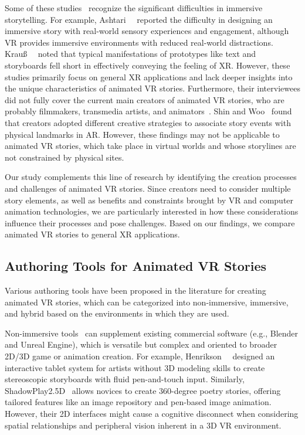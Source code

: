 Some of these studies~\cite{ashtari2020creating, krauss2021current, borsting2022software, krauss2022elements, mendez2025immersivesurvey} recognize the significant difficulties in immersive storytelling. 
For example, Ashtari~\etal~\cite{ashtari2020creating} reported the difficulty in designing an immersive story with real-world sensory experiences and engagement, although VR provides immersive environments with reduced real-world distractions. 
Krauß~\etal~\cite{krauss2022elements} noted that typical manifestations of prototypes like text and storyboards fell short in effectively conveying the feeling of XR. However, these studies primarily focus on general XR applications and lack deeper insights into the unique characteristics of animated VR stories. Furthermore, their interviewees did not fully cover the current main creators of animated VR stories, who are probably filmmakers, transmedia artists, and animators~\cite{henrikson2016multi,rall2022pericles, cutler2019making}. 
Shin and Woo~\cite{shin2023space} found that creators adopted different creative strategies to associate story events with physical landmarks in AR. However, these findings may not be applicable to animated VR stories, which take place in virtual worlds and whose storylines are not constrained by physical sites.

Our study complements this line of research by identifying the creation processes and challenges of animated VR stories. 
Since creators need to consider multiple story elements, as well as benefits and constraints brought by VR and computer animation technologies, we are particularly interested in how these considerations influence their processes and pose challenges. 
Based on our findings, we compare animated VR stories to general XR applications. 



\subsection{Authoring Tools for Animated VR Stories}
\label{sec:related_authoring_story}

Various authoring tools have been proposed in the literature for creating animated VR stories, which can be categorized into non-immersive, immersive, and hybrid based on the environments in which they are used. 

Non-immersive tools~\cite{henrikson2016storeoboard, zhao2020shadowplay2} can supplement existing commercial software (e.g., Blender and Unreal Engine), which is versatile but complex and oriented to broader 2D/3D game or animation creation. 
For example, Henrikson~\etal~\cite{henrikson2016storeoboard} designed an interactive tablet system for artists without 3D modeling skills to create stereoscopic storyboards with fluid pen-and-touch input.  
Similarly, ShadowPlay2.5D~\cite{zhao2020shadowplay2} allows novices to create 360-degree poetry stories, offering tailored features like an image repository and pen-based image animation. However, their 2D interfaces might cause a cognitive disconnect when considering spatial relationships and peripheral vision inherent in a 3D VR environment. 

